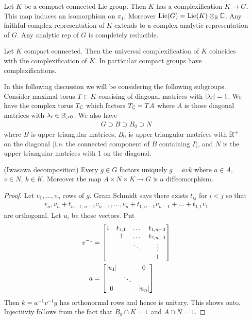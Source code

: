 \documentclass[12pt]{article}
\begin{document}
\begin{theorem}
    Let $K$ be a compact connected Lie group. Then $K$ has a complexification $K\to G$. This map induces 
    an isomorphism on $\pi_1$. Moreover $\operatorname{Lie}(G) = \operatorname{Lie}(K)\otimes_{\mathbb{R}}\mathbb{C}$. Any faithful complex 
    representation of $K$ extends to a complex analytic representation of $G$. Any analytic rep of $G$ is completely reducible.
\end{theorem}

\begin{theorem}
    Let $K$ compact connected. Then the universal complexification of $K$ coincides with 
    the complexification of $K$. In particular compact groups have complexifications.
\end{theorem}


In this following discussion we will be considering the following subgroups.
Consider maximal torus $T\subset K$ consising of diagonal matrices with $\lvert \lambda_i\vert = 1$. 
We have the complex torus $T_{\mathbb{C}}$ which factors $T_{\mathbb{C}} = TA$ where $A$ is those
diagonal matrices with $\lambda_i\in\mathbb{R}_{>0}$. We also have \begin{align*}
    G \supset B \supset B_0 \supset N
\end{align*} where $B$ is upper triangular matrices, $B_0$ is upper triangular matrices 
with $\mathbb{R}^+$ on the diagonal (i.e. the connected component of $B$ containing $I$),
 and $N$ is the upper triangular matrices with $1$ on the diagonal.

\begin{proposition}
    (Iwasawa decomposition)
    Every $g\in G$ factors uniquely $g = avk$ where $a\in A$, $v\in N$, $k\in K$. Moreover the map 
    $A\times N\times K\to G$ is a diffeomorphism.
\end{proposition}

\begin{proof}
    Let $v_1,\dots,v_n$ rows of $g$. Gram Schmidt says there exists $t_{ij}$ for $i<j$ so that \begin{align*}
        v_n,v_n+t_{n-1,n-1}v_{n-1},\dots,v_n + t_{1,n-1}v_{n-1} + \dots + t_{1,1}v_1
    \end{align*} are orthogonal. Let $u_i$ be those vectors.
    Put \begin{align*}
        v^{-1} &= \begin{bmatrix}
            1 & t_{1,1} & \dots & t_{1,n-1}\\
            & 1 & \dots & t_{2,n-1}\\
            & & \ddots & \vdots\\
            & & & 1
        \end{bmatrix}\\
        a &= \begin{bmatrix}
            \lvert u_1\vert & & 0\\
            & \ddots & \\
            0 & & \lvert u_n\vert
        \end{bmatrix}
    \end{align*}
    Then $k = a^{-1}v^{-1}g$ has orthonormal rows and hence is unitary. This shows onto. 
    Injectiivty follows from the fact that $B_0\cap K = 1$ and $A\cap N = 1$.
\end{proof}
\end{document}
